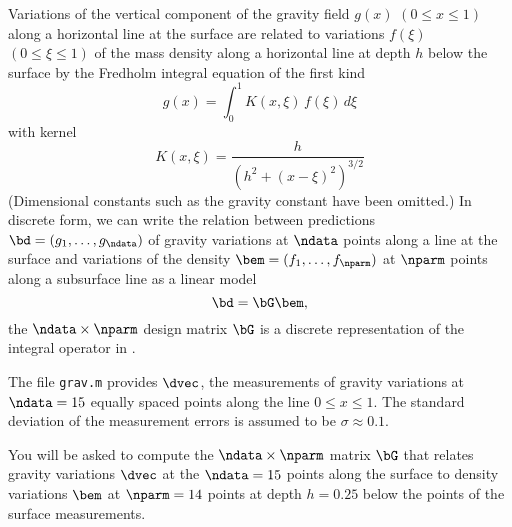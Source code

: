 \documentclass[11pt,titlepage,fleqn]{article}
\newcommand{\numdataG}{15}
\newcommand{\numparmG}{14}
\newcommand{\mv}{\xi}  %
\newcommand{\dv}{x}  %
\newcommand{\dep}{h}
\begin{document}
Variations of the vertical component of the gravity field $g(\dv)$ $(0 \le \dv \le 1)$ along a horizontal line at the surface are related to variations $f(\mv)$ $(0 \le \mv \le 1)$ of the mass density along a horizontal line at depth $\dep$ below the surface by the Fredholm integral equation of the first kind \citep[\eg][eq.~1.31]{AsterE2}
%
\begin{equation}
g(\dv) = \int_0^1 K(\dv,\mv)\,f(\mv)\,d\mv
\label{gs}
\end{equation}
%
with kernel
%
\begin{equation}
K(\dv,\mv) = \frac{\dep}{\left(\dep^2 + (\dv-\mv)^2\right)^{3/2}}
\label{Kxy}
\end{equation}
%
(Dimensional constants such as the gravity constant have been omitted.) In discrete form, we can write the relation between predictions $\bd = (g_1,\ldots,g_\ndata)$ of gravity variations at $\ndata$ points along a line at the surface and variations of the density $\bem = (f_1,\ldots,f_\nparm)$ at $\nparm$ points along a subsurface line as a linear model
%
\begin{equation}
\bd = \bG\bem,
\end{equation}
%
the $\ndata \times \nparm$ design matrix $\bG$ is a discrete representation of the integral operator in .

The file \verb+grav.m+ provides $\dvec$, the measurements of gravity variations at $\ndata = \numdataG$ equally spaced points along the line $0 \le \dv \le 1$. The standard deviation of the measurement errors is assumed to be $\sigma \approx 0.1$.

You will be asked to compute
the $\ndata \times \nparm$ matrix $\bG$ that relates gravity variations $\dvec$ at the $\ndata=\numdataG$ points along the surface to density variations $\bem$ at $\nparm = \numparmG$ points at depth $\dep = 0.25$ below the points of the surface measurements. 


\end{document}
